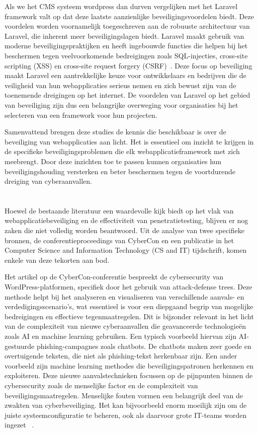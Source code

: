 Als we het CMS systeem wordpress dan durven vergelijken met het Laravel framework valt op dat deze laatste aanzienlijke beveiligingsvoordelen biedt. Deze voordelen worden voornamelijk toegeschreven aan 
de robuuste architectuur van Laravel, die inherent meer beveiligingslagen biedt. Laravel maakt gebruik van moderne beveiligingspraktijken en heeft ingebouwde 
functies die helpen bij het beschermen tegen veelvoorkomende bedreigingen zoals SQL-injecties, cross-site scripting (XSS) en cross-site request forgery (CSRF)~\autocite{Lebedeva2023}. Deze focus 
op beveiliging maakt Laravel een aantrekkelijke keuze voor ontwikkelaars en bedrijven die de veiligheid van hun webapplicaties serieus nemen en zich bewust 
zijn van de toenemende dreigingen op het internet. De voordelen van Laravel op het gebied van beveiliging zijn dus een belangrijke overweging voor organisaties 
bij het selecteren van een framework voor hun projecten.

Samenvattend brengen deze studies de kennis die beschikbaar is over de beveiliging van webapplicaties aan licht. 
Het is essentieel om inzicht te krijgen in de specifieke beveiligingsproblemen die elk webapplicatieframework met zich meebrengt. Door deze inzichten 
toe te passen kunnen organisaties hun beveiligingshouding versterken en beter beschermen tegen de voortdurende dreiging van cyberaanvallen.

\section{}
Hoewel de bestaande literatuur een waardevolle kijk biedt op het vlak van webapplicatiebeveiliging en de effectiviteit van penetratietesting, blijven er nog 
zaken die niet volledig worden beantwoord. Uit de analyse van twee specifieke bronnen, de conferentieproceedings van CyberCon en een publicatie in het 
Computer Science and Information Technology (CS and IT) tijdschrift, komen enkele van deze tekorten aan bod.

Het artikel op de CyberCon-conferentie bespreekt de cybersecurity van WordPress-platformen, specifiek door het gebruik van attack-defense trees. Deze methode helpt 
bij het analyseren en visualiseren van verschillende aanvals- en verdedigingsscenario's, wat essentieel is voor een diepgaand begrip van mogelijke bedreigingen en 
effectieve tegenmaatregelen. Dit is bijzonder relevant in het licht van de complexiteit van nieuwe cyberaanvallen die geavanceerde technologieën zoals AI en machine 
learning gebruiken. Een typisch voorbeeld hiervan zijn AI-gestuurde phishing-campagnes zoals chatbots. De chatbots maken zeer goede en overtuigende teksten, die niet als 
phishing-tekst herkenbaar zijn. Een ander voorbeeld zijn machine learning methodes die beveiligingspatronen herkennen en exploiteren. Deze nieuwe aanvalstechnieken
focussen op de pijnpunten binnen de cybersecurity zoals de menselijke factor en de complexiteit van beveiligingsmaatregelen. Menselijke fouten vormen een belangrijk 
deel van de zwakten van cyberbeveiliging. Het kan bijvoorbeeld enorm moeilijk zijn om de juiste systeemconfiguratie te beheren, ook als daarvoor grote IT-teams worden 
ingezet ~\autocite{Petrica2022}.

